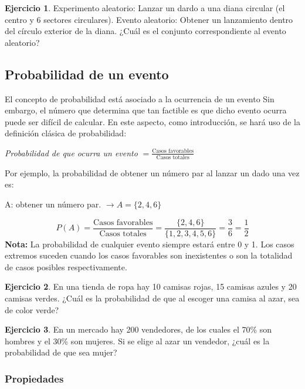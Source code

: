 \documentclass[
  11pt,
]{book}
\theoremstyle{definition}
\theoremstyle{definition}
\theoremstyle{definition}
\newtheorem{exercise}{Ejercicio}[chapter]
\theoremstyle{definition}
\theoremstyle{remark}
\begin{document}
\begin{exercise}
Experimento aleatorio: Lanzar un dardo a una diana circular (el centro y 6 sectores circulares). Evento aleatorio: Obtener un lanzamiento dentro del círculo exterior de la diana. ¿Cuál es el conjunto correspondiente al evento aleatorio?
\end{exercise}

\subsection{Probabilidad de un evento}\label{probabilidad-evento}

El concepto de probabilidad está asociado a la ocurrencia de un evento Sin embargo, el número que determina que tan factible es que dicho evento ocurra puede ser difícil de calcular. En este aspecto, como introducción, se hará uso de la definición clásica de probabilidad:

\emph{Probabilidad de que ocurra un evento} \(= \displaystyle\frac{\text{Casos favorables}}{\text{Casos totales}}\)

Por ejemplo, la probabilidad de obtener un número par al lanzar un dado una vez es:

A: obtener un número par. \(\rightarrow A = \lbrace 2,4,6 \rbrace\)

\[P(A) = \frac{\text{Casos favorables}}{\text{Casos totales}} = \frac{\lbrace 2,4,6 \rbrace}{\lbrace 1,2,3,4,5,6 \rbrace} = \frac{3}{6}= \frac{1}{2}\]
\textbf{Nota:} La probabilidad de cualquier evento siempre estará entre 0 y 1. Los casos extremos suceden cuando los casos favorables son inexistentes o son la totalidad de casos posibles respectivamente.

\begin{exercise}
En una tienda de ropa hay 10 camisas rojas, 15 camisas azules y 20 camisas verdes. ¿Cuál es la probabilidad de que al escoger una camisa al azar, sea de color verde?
\end{exercise}

\begin{exercise}
En un mercado hay 200 vendedores, de los cuales el 70\% son hombres y el 30\% son mujeres. Si se elige al azar un vendedor, ¿cuál es la probabilidad de que sea mujer?
\end{exercise}

\subsubsection{Propiedades}\label{probabilidad-variables-elementos-eventos-propiedades}
\end{document}
